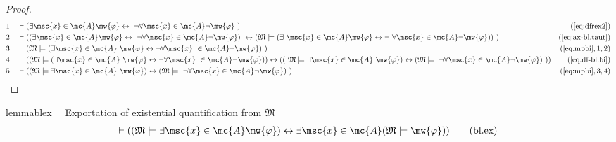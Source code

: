 \begin{proof}
\begin{align}
  1 &&  & \vdash ( \exists \msc{x} \in \mc{A} \mw{\varphi} \leftrightarrow
     ~\lnot \forall \msc{x} \in \mc{A} \lnot \mw{\varphi}
     ~)&(\mbox{\ref{eq:dfrex2}})\notag
  \\ 2 &&  & \vdash ( ( \exists \msc{x} \in \mc{A} \mw{\varphi} \leftrightarrow
     ~\lnot \forall \msc{x} \in \mc{A} \lnot \mw{\varphi} )
     ~\leftrightarrow ( \mathfrak{M} \models ( \exists
     ~\msc{x} \in \mc{A} \mw{\varphi} \leftrightarrow \lnot
     ~\forall \msc{x} \in \mc{A} \lnot \mw{\varphi} ) )
     ~)&(\mbox{\ref{eq:ax-bl.taut}})\notag
  \\ 3 &&  & \vdash ( \mathfrak{M} \models ( \exists \msc{x} \in \mc{A}
     ~\mw{\varphi} \leftrightarrow \lnot \forall \msc{x}
     ~\in \mc{A} \lnot \mw{\varphi} )
     ~)&(\mbox{\ref{eq:mpbi}},1,2)\notag
  \\ 4 &&  & \vdash ( ( \mathfrak{M} \models ( \exists \msc{x} \in \mc{A}
     ~\mw{\varphi} \leftrightarrow \lnot \forall \msc{x}
     ~\in \mc{A} \lnot \mw{\varphi} ) ) \leftrightarrow ( (
     ~\mathfrak{M} \models \exists \msc{x} \in \mc{A}
     ~\mw{\varphi} ) \leftrightarrow ( \mathfrak{M} \models
     ~\lnot \forall \msc{x} \in \mc{A} \lnot \mw{\varphi} )
     ~) )&(\mbox{\ref{eq:df-bl.bi}})\notag
  \\ 5 &&  & \vdash ( ( \mathfrak{M} \models \exists \msc{x} \in \mc{A}
     ~\mw{\varphi} ) \leftrightarrow ( \mathfrak{M} \models
     ~\lnot \forall \msc{x} \in \mc{A} \lnot \mw{\varphi} )
     ~)&(\mbox{\ref{eq:mpbi}},3,4)\notag
\end{align}
\end{proof}

\begin{restatable}{lemma}{blex}~~ Exportation of existential quantification
from $\mathfrak{M}$
\begin{align}
\vdash ( ( \mathfrak{M} \models \exists \msc{x} \in \mc{A} \mw{\varphi} )
    \leftrightarrow \exists \msc{x} \in \mc{A} ( \mathfrak{M} \models
    \mw{\varphi} ) )\label{eq:bl.ex}\tag{bl.ex}
\end{align}
\end{restatable}

